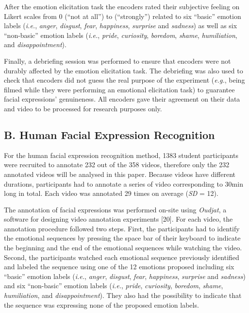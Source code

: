 \documentclass[conference,final,]{IEEEtran}
\begin{document}
After the emotion elicitation task the encoders rated their subjective
feeling on Likert scales from 0 (``not at all'') to 
\nolinebreak (``strongly'') related to six ``basic'' emotion labels
(\emph{i.e.}, \emph{anger}, \emph{disgust}, \emph{fear},
\emph{happiness}, \emph{surprise} and \emph{sadness}) as well as six
``non-basic'' emotion labels (\emph{i.e.}, \emph{pride},
\emph{curiosity}, \emph{boredom}, \emph{shame}, \emph{humiliation}, and
\emph{disappointment}).

Finally, a debriefing session was performed to ensure that encoders were
not durably affected by the emotion elicitation task. The debriefing was
also used to check that encoders did not guess the real purpose of the
experiment (\emph{e.g.}, being filmed while they were performing an
emotional elicitation task) to guarantee facial expressions'
genuineness. All encoders gave their agreement on their data and video
to be processed for research purposes only.

\hypertarget{b.-human-facial-expression-recognition}{%
\subsection{B. Human Facial Expression
Recognition}\label{b.-human-facial-expression-recognition}}

For the human facial expression recognition method, 1383
\nolinebreak student participants were recruited to annotate 232 out of
the 358 videos, therefore only the 232 annotated videos will be analysed
in this paper. Because videos have different durations, participants had
to annotate a series of video corresponding to 30min long in total. Each
video was annotated 29 times on average (\emph{SD} = 12).

The annotation of facial expressions was performed on-site using
\emph{Oudjat}, a software for designing video annotation experiments
{[}20{]}. For each video, the annotation procedure followed two steps.
First, the participants had to identify the emotional sequences by
pressing the space bar of their keyboard to indicate the beginning and
the end of the emotional sequences while watching the video. Second, the
participants watched each emotional sequence previously identified and
labeled the sequence using one of the 12 \nolinebreak emotions proposed
including six ``basic'' emotion labels (\emph{i.e.}, \emph{anger},
\emph{disgust}, \emph{fear}, \emph{happiness}, \emph{surprise} and
\emph{sadness}) and six ``non-basic'' emotion labels (\emph{i.e.},
\emph{pride}, \emph{curiosity}, \emph{boredom}, \emph{shame},
\emph{humiliation}, and \emph{disappointment}). They also had the
possibility to indicate that the sequence was expressing none of the
proposed emotion labels.
\end{document}
